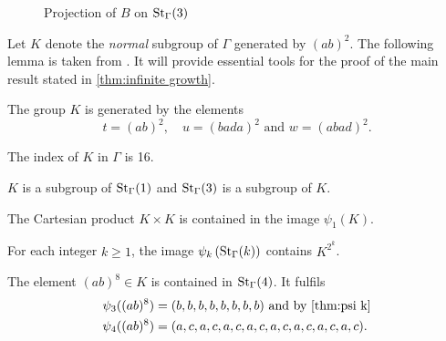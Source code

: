 \begin{figure}
\begin{center}
{%
%
}
\caption{Projection of $B$ on $\St[\Gamma]{3}$}
\label{g:B on St Gamma 3}
\end{center}
\end{figure}

Let $K$ denote the \emph{normal} subgroup of $\Gamma$ generated by $(ab)^2$. The following lemma is taken from \cite{de2000topics}. It will provide essential tools for the proof of the main result stated in \cref{thm:infinite growth}.
\begin{lem}
\begin{thmlist}
\item The group $K$ is generated by the elements
\begin{equation*}
t=(ab)^2,\quad u=(bada)^2\text{ and }w=(abad)^2.
\end{equation*}
\item The index of $K$ in $\Gamma$ is 16.
\item $K$ is a subgroup of $\St[\Gamma]{1}$ and $\St[\Gamma]{3}$ is a subgroup of $K$.
\item The Cartesian product $K\times K$ is contained in the image $\psi_1(K).$
\item \label{thm:psi k(K)} For each integer $k\geq 1$, the image $\psi_k\left(\St[\Gamma]{k}\right)$ contains $K^{2^k}$.
\item \label{thm:psi4((ab)8)} The element $(ab)^8\in K$ is contained in $\St[\Gamma]{4}$. It fulfils
\begin{align*}
\psi_3((ab)^8)&=(b,b,b,b,b,b,b,b)\text{ and by \cref{thm:psi k}}\\
\psi_4((ab)^8)&=(a,c,a,c,a,c,a,c,a,c,a,c,a,c,a,c).
\end{align*}
\end{thmlist}
\end{lem}
